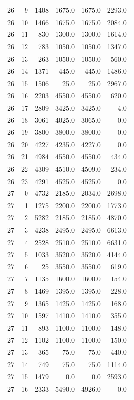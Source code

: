 \begin{longtable}{rrrrrr}
26 & 9 & 1408 & 1675.0 & 1675.0 & 2293.0\\
26 & 10 & 1466 & 1675.0 & 1675.0 & 2084.0\\
26 & 11 & 830 & 1300.0 & 1300.0 & 1614.0\\
26 & 12 & 783 & 1050.0 & 1050.0 & 1347.0\\
26 & 13 & 263 & 1050.0 & 1050.0 & 560.0\\
26 & 14 & 1371 & 445.0 & 445.0 & 1486.0\\
26 & 15 & 1506 & 25.0 & 25.0 & 2967.0\\
26 & 16 & 2203 & 4550.0 & 4550.0 & 620.0\\
26 & 17 & 2809 & 3425.0 & 3425.0 & 4.0\\
26 & 18 & 3061 & 4025.0 & 3065.0 & 0.0\\
26 & 19 & 3800 & 3800.0 & 3800.0 & 0.0\\
26 & 20 & 4227 & 4235.0 & 4227.0 & 0.0\\
26 & 21 & 4984 & 4550.0 & 4550.0 & 434.0\\
26 & 22 & 4309 & 4510.0 & 4509.0 & 234.0\\
26 & 23 & 4291 & 4525.0 & 4525.0 & 0.0\\
27 & 0 & 4732 & 2185.0 & 2034.0 & 2698.0\\
27 & 1 & 1275 & 2200.0 & 2200.0 & 1773.0\\
27 & 2 & 5282 & 2185.0 & 2185.0 & 4870.0\\
27 & 3 & 4238 & 2495.0 & 2495.0 & 6613.0\\
27 & 4 & 2528 & 2510.0 & 2510.0 & 6631.0\\
27 & 5 & 1033 & 3520.0 & 3520.0 & 4144.0\\
27 & 6 & 25 & 3550.0 & 3550.0 & 619.0\\
27 & 7 & 1135 & 1600.0 & 1600.0 & 154.0\\
27 & 8 & 1469 & 1395.0 & 1395.0 & 228.0\\
27 & 9 & 1365 & 1425.0 & 1425.0 & 168.0\\
27 & 10 & 1597 & 1410.0 & 1410.0 & 355.0\\
27 & 11 & 893 & 1100.0 & 1100.0 & 148.0\\
27 & 12 & 1102 & 1100.0 & 1100.0 & 150.0\\
27 & 13 & 365 & 75.0 & 75.0 & 440.0\\
27 & 14 & 749 & 75.0 & 75.0 & 1114.0\\
27 & 15 & 1479 & 0.0 & 0.0 & 2593.0\\
27 & 16 & 2333 & 5490.0 & 4926.0 & 0.0\\

\end{longtable}
